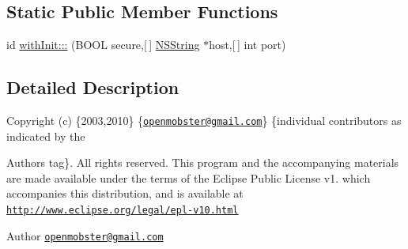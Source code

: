\subsection*{\-Static \-Public \-Member \-Functions}
\begin{DoxyCompactItemize}
\item 
id \hyperlink{interface_net_session_aec2604b1d4473f35d216614ff200063a}{with\-Init\-:::} (\-B\-O\-O\-L secure,\mbox{[}$\,$\mbox{]} \hyperlink{class_n_s_string}{\-N\-S\-String} $\ast$host,\mbox{[}$\,$\mbox{]} int port)
\end{DoxyCompactItemize}


\subsection{\-Detailed \-Description}
\-Copyright (c) \{2003,2010\} \{\href{mailto:openmobster@gmail.com}{\tt openmobster@gmail.\-com}\} \{individual contributors as indicated by the \begin{DoxyAuthor}{\-Authors}
tag\}. \-All rights reserved. \-This program and the accompanying materials are made available under the terms of the \-Eclipse \-Public \-License v1. which accompanies this distribution, and is available at \href{http://www.eclipse.org/legal/epl-v10.html}{\tt http\-://www.\-eclipse.\-org/legal/epl-\/v10.\-html}
\end{DoxyAuthor}
\begin{DoxyAuthor}{\-Author}
\href{mailto:openmobster@gmail.com}{\tt openmobster@gmail.\-com} 
\end{DoxyAuthor}


